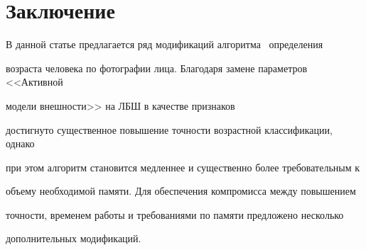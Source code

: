 


\section{Заключение}



В данной статье предлагается ряд модификаций алгоритма~\cite{5-r} определения

возраста человека по фотографии лица. Благодаря замене параметров <<Активной

модели внешности>> на ЛБШ в качестве признаков

достигнуто существенное повышение точности возрастной классификации, однако

при этом алгоритм становится медленнее и существенно более требовательным к

объему необходимой памяти. Для обеспечения компромисса между повышением

точности, временем работы и требованиями по памяти предложено несколько

дополнительных модификаций.






